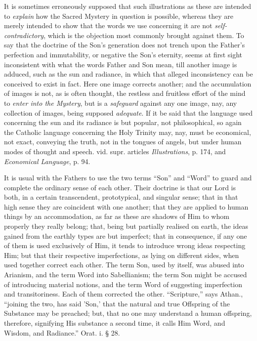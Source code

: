 It is sometimes erroneously supposed that such
illustrations as these are intended to \emph{explain} how the Sacred Mystery in question is possible, whereas they are merely
intended to show that the words we use concerning it are not \emph{self-contradictory},
which is the objection most commonly brought against them. To say that
the doctrine of the Son's generation does not trench upon the Father's
perfection and immutability, or negative the Son's eternity, seems at
first sight inconsistent with what the words Father and Son mean, till
another image is adduced, such as the sun and radiance, in which that
alleged inconsistency can be conceived to exist in fact. Here one
image corrects another; and the accumulation of images is not, as is
often thought, the restless and fruitless effort of the mind to \emph{enter
into the Mystery}, but is a \emph{safeguard} against any one image,
nay, any collection of images, being supposed \emph{adequate}. If it
be said that the language used concerning the sun and its radiance is
but popular, not philosophical, so again the Catholic language
concerning the Holy Trinity may, nay, must be economical, not exact,
conveying the truth, not in the tongues of angels, but under human
modes of thought and speech. vid. supr. articles \emph{Illustrations},
p. 174, and \emph{Economical Language}, p. 94.

It is usual with the Fathers to use the two terms
``Son'' and ``Word'' to guard and complete the ordinary sense of each
other. Their doctrine is that our Lord is both, in a certain
transcendent, prototypical, and singular sense; that in that high
sense they are coincident with one another; that they are applied to
human things by an accommodation, as far as these are shadows of Him
to whom properly they really belong; that, being but partially
realised on earth, the ideas gained from the earthly types are but
imperfect; that in consequence, if any one of them is used exclusively
of Him, it tends to introduce wrong ideas respecting Him; but that
their respective imperfections, as lying on different sides, when used
together correct each other. The term Son, used by itself, was abused
into Arianism, and the term Word into Sabellianism; the term Son might
be accused of introducing material notions, and the term Word of
suggesting imperfection and transitoriness. Each of them corrected the
other. ``Scripture,'' says Athan., ``joining the two, has said 'Son,'
that the natural and true Offspring of the Substance may be preached;
but, that no one may understand a human offspring, therefore,
signifying His substance a second time, it calls Him Word, and Wisdom,
and Radiance.'' Orat. i. § 28.


